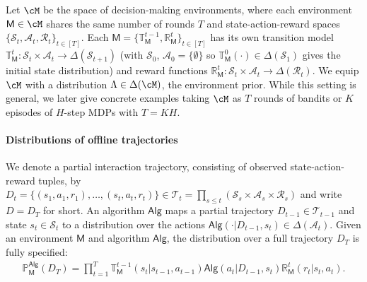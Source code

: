 \documentclass[10pt]{article}
\newcommand{\<}{\left\langle}
\renewcommand{\>}{\right\rangle}
\renewcommand{\P}{\mathbb{P}}
\newcommand{\inst}{{\mathsf{M}}}
\newcommand{\trajsp}{{\mathcal{T}}}
\newcommand{\transmodel}{{\mathbb T}}
\newcommand{\rewmodel}{{\mathbb R}}
\newcommand{\state}{{s}}
\newcommand{\action}{{a}}
\newcommand{\reward}{{r}}
\newcommand{\totlen}{{T}}
\newcommand{\sAlg}{{\mathsf{Alg}}}
\newcommand{\dset}{{D}}
\newcommand{\prior}{{\Lambda}}
\newcommand{\statesp}{{\mathcal{S}}}
\newcommand{\actionsp}{{\mathcal{A}}}
\newcommand{\rewardsp}{{\mathcal{R}}}
\begin{document}
Let $\cM$ be the space of decision-making environments, where each environment $\inst \in \cM$ shares the same number of rounds $\totlen$ and state-action-reward spaces $\{ \statesp_t,  \actionsp_t, \rewardsp_t \}_{t \in [\totlen]}$. Each $\inst = \{\transmodel_\inst^{t-1}, \rewmodel_\inst^t \}_{t \in [\totlen]}$ has its own transition model $\transmodel_\inst^t: \statesp_{t} \times \actionsp_{t} \to \Delta(\statesp_{t+1})$ (with $\statesp_0$, $\actionsp_0 = \{ \emptyset \}$ so $\transmodel_\inst^0(\cdot) \in \Delta(\statesp_1)$ gives the initial state distribution) and reward functions $\rewmodel_\inst^{t}: \statesp_{t} \times \actionsp_{t} \to \Delta(\rewardsp_t)$. We equip $\cM$ with a distribution $\prior \in \Delta(\cM)$, the environment prior. While this setting is general, we later give concrete examples taking $\cM$ as $\totlen$ rounds of bandits or $K$ episodes of $H$-step MDPs with $\totlen = K H$.

\paragraph{Distributions of offline trajectories} We denote a partial interaction trajectory, consisting of observed state-action-reward tuples, by $\dset_t=\{(\state_1,\action_1,\reward_1),\ldots,(\state_t,\action_t,\reward_t)\} \in \trajsp_t = \prod_{s \le t} (\statesp_s \times \actionsp_s \times \rewardsp_s)$ and write $\dset = \dset_{\totlen}$ for short. An algorithm $\sAlg$ maps a partial trajectory $\dset_{t-1} \in \trajsp_{t-1}$ and state $\state_t \in \statesp_t$ to a distribution over the actions $\sAlg(\cdot | \dset_{t-1}, \state_t) \in \Delta(\actionsp_t)$. Given an environment $\inst$ and algorithm $\sAlg$, the distribution over a full trajectory $\dset_\totlen$ is fully specified:
\begin{align*}
\textstyle \P_{\inst}^{\sAlg}(\dset_\totlen) =
\prod_{t=1}^{\totlen}\transmodel_{\inst}^{t-1}(\state_{t}|\state_{t-1},\action_{t-1}) \sAlg(\action_t|\dset_{t-1},\state_t)\rewmodel_{\inst}^t(\reward_t|\state_t,\action_t).
\end{align*}
\end{document}
